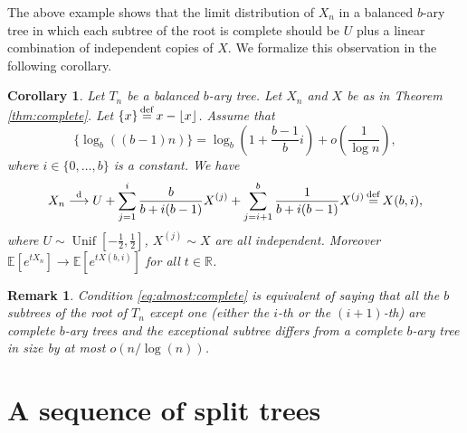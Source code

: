 \documentclass[11pt]{article}
\newcommand{\E}[1]{\mathbb{E} \left[#1\right]}
\def\R{\mathbb{R}}
\numberwithin{theorem}{section}
\newtheorem{corollary}[theorem]{Corollary}
\newtheorem{remark}[theorem]{Remark}
\theoremstyle{definition}
\newcommand{\floor}[1]{\lfloor #1 \rfloor}
\newcommand{\inlaw}{\dto}%
\newcommand{\eqd}{\,{\buildrel {\mathrm{def}} \over =}\,}
\newcommand{\Unif}{\mathop{\mathrm{Unif}}}
\numberwithin{equation}{section}
\newcommand{\too}{\longrightarrow}
\newcommand\dto{\overset{\mathrm{d}}{\too}}
\begin{document}
The above example shows that the limit distribution of \(X_n\) in a balanced \(b\)-ary tree
in which each subtree of the root is complete should be 
\(U\) plus a linear combination of independent copies of \(X\).
We formalize this observation in the following corollary.
\begin{corollary}
    Let \(T_n\) be a balanced \(b\)-ary tree. 
    Let \(X_n\) and \(X\) be as in Theorem \ref{thm:complete}.
    Let \(\{x\} \eqd x-\floor{x}\).
    Assume that
\begin{equation}
        \{\log_{b}\left( (b-1)n \right)\}
        =
        \log_{b} \left( 1+\frac{b-1}{b}i \right)
        +
        o\left( \frac{1}{\log n} \right)
        ,
        \label{eq:almost:complete}
    \end{equation}
    where \(i \in \{0,\dots,b\}\) is a constant.
    We have
    \[
        X_{n} 
        \inlaw 
        U 
        + \sum_{j=1}^{i} \frac{b}{b+i(b-1)} X^{(j)}
        + \sum_{j=i+1}^{b} \frac{1}{b+i(b-1)} X^{(j)}
        \eqd X(b,i)
        ,
    \]
    where \(U \sim \Unif[-\frac{1}{2},\frac{1}{2}]\), \(X^{(j)}\sim X\) are all independent.
    Moreover \(\E{e^{tX_{n}}} \to \E{e^{tX(b,i)}}\) for all \(t \in \R\).
\end{corollary}

\begin{remark}
Condition \eqref{eq:almost:complete} is equivalent of saying that all the
\(b\) subtrees of the root of \(T_n\) except one (either the \(i\)-th or the \((i+1)\)-th) are
complete \(b\)-ary trees and the exceptional subtree differs from a complete \(b\)-ary tree in
size by at most \(o(n/\log(n))\).
\end{remark}

\section{A sequence of split trees}\label{sec:split}
\end{document}
